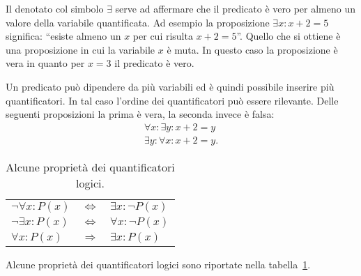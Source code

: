 Il  denotato col simbolo
$\exists$ serve ad affermare che il predicato è vero per
almeno un valore della variabile quantificata.
Ad esempio la proposizione $\exists x\colon x+2=5$ significa:
``esiste almeno un $x$ per cui risulta $x+2=5$''.
Quello che si ottiene è una proposizione in cui la variabile
$x$ è muta. In questo caso la proposizione è vera in quanto
per $x=3$ il predicato è vero.

Un predicato può dipendere da più variabili ed è quindi
possibile inserire più quantificatori. In tal caso l'ordine
dei quantificatori può essere rilevante.
Delle seguenti proposizioni la prima è vera, la seconda
invece è falsa:
\begin{gather*}
\forall x\colon \exists y\colon x+2=y \\
\exists y\colon \forall x\colon x+2=y.
\end{gather*}

\begin{table}
\begin{center}
\begin{tabular}{lcl}
$\lnot \forall x \colon P(x)$ & $\iff$ & $\exists x \colon \lnot P(x)$\\
$\lnot \exists x \colon P(x)$ & $\iff$ & $\forall x \colon \lnot P(x)$\\
$\forall x \colon P(x)$ & $\Longrightarrow$ & $\exists x \colon P(x)$
\end{tabular}
\end{center}
\caption{Alcune proprietà dei quantificatori logici.}
\label{tab:proprieta_quantificatori}
\end{table}

Alcune proprietà dei quantificatori logici sono riportate
nella tabella~\ref{tab:proprieta_quantificatori}.


